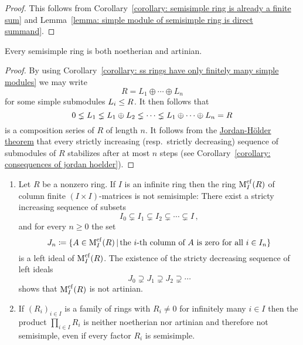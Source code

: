 \begin{proof}
  This follows from Corollary~\ref{corollary: semisimple ring is already a finite sum} and Lemma~\ref{lemma: simple module of semisimple ring is direct summand}.
\end{proof}


\begin{corollary}
  \label{corollary: semisimple rings are notherian artinian}
  Every semisimple ring is both noetherian and artinian.
\end{corollary}


\begin{proof}
  By using Corollary~\ref{corollary: ss rings have only finitely many simple modules} we may write
  \[
    R = L_1 \oplus \dotsb \oplus L_n
  \]
  for some simple submodules $L_i \leq R$.
  It then follows that
  \[
                0
    \lneq L_1
    \lneq L_1 \oplus L_2
    \lneq \dotsb
    \lneq L_1 \oplus \dotsb \oplus L_n
    =           R
  \]
  is a composition series of $R$ of length $n$.
  It follows from the \hyperref[theorem: jordan hoelder theorem]{Jordan-Hölder theorem} that every strictly increasing (resp.\ strictly decreasing) sequence of submodules of $R$ stabilizes after at most $n$ steps (see Corollary~\ref{corollary: consequences of jordan hoelder}).
\end{proof}


\begin{example}
  \leavevmode
  \label{example: more non ss rings}
  \begin{enumerate}
    \item
      Let $R$ be a nonzero ring.
      If $I$ is an infinite ring then the ring $\operatorname{M}_I^{{\operatorname{cf}}}(R)$ of column finite $(I \times I)$-matrices is not semisimple:
      There exist a stricty increasing sequence of subsets
      \[
                    I_0
        \subsetneq  I_1
        \subsetneq  I_2
        \subsetneq  \dotsb
        \subsetneq  I \,,
      \]
      and for every $n \geq 0$ the set
      \[
                  J_n
        \defined  \{
                    A \in \Mat_I^{\cf}(R)
                  \suchthat
                    \text{the $i$-th column of $A$ is zero for all $i \in I_n$}
                  \}
      \]
      is a left ideal of $\operatorname{M}_I^{{\operatorname{cf}}}(R)$.
      The existence of the stricty decreasing sequence of left ideals
      \[
                    J_0
        \supsetneq  J_1
        \supsetneq  J_2
        \supsetneq  \dotsb
      \]
      shows that $\operatorname{M}_I^{{\operatorname{cf}}}(R)$ is not artinian.
    \item
      If $(R_i)_{i \in I}$ is a family of rings with $R_i \neq 0$ for infinitely many $i \in I$ then the product $\prod_{i \in I} R_i$ is neither noetherian nor artinian and therefore not semisimple, even if every factor $R_i$ is semisimple.
  \end{enumerate}
\end{example}




